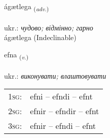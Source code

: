 \documentclass[frontgrid, backgrid]{flacards}\usepackage[]{graphicx}\usepackage[]{xcolor}
\begin{document}

\renewcommand{\flhead}{\vskip5pt \fboxsep=0pt {\small\bfseries\footnotesize Atviksorð | прислівник}}
\renewcommand{\fcfoot}{\vskip5pt \fboxsep=0pt \hspace{2pt}{\small\bfseries\footnotesize 2K}}

\renewcommand{\blhead}{\vskip5pt {\small\bfseries\footnotesize Atviksorð | прислівник }}
\renewcommand{\bcfoot}{\vskip5pt \hspace{2pt}{\small\bfseries\footnotesize 2K}}


{ágætlega \small{\textsubscript{(\textit{adv.})}} \\[1ex]
\textphonetic{[auːcaitlɛɣa]} \\
ukr.: \emph{чудово; відмінно; гарно} \\  [2ex]
ágætlega (Indeclinable)}

\renewcommand{\flhead}{\vskip5pt \fboxsep=0pt {\small\bfseries\footnotesize Sagnorð | дієслово}}
\renewcommand{\fcfoot}{\vskip5pt \fboxsep=0pt \hspace{2pt}{\small\bfseries\footnotesize 2K}}

\renewcommand{\blhead}{\vskip5pt {\small\bfseries\footnotesize Sagnorð | дієслово }}
\renewcommand{\bcfoot}{\vskip5pt \hspace{2pt}{\small\bfseries\footnotesize 2K}}


{efna \small{\textsubscript{(\textit{v.})}} \\[1ex] %
\textphonetic{[ɛpna]} \\
ukr.: \emph{виконувати; влаштовувати} \\  [2ex]
\renewcommand*{\arraystretch}{0.8}
\begin{tabular}{p{1cm}l}
\textsc{1sg}: & efni -- efndi -- efnt \\ 
\textsc{2sg}: & efnir -- efndir -- efnt \\ 
\textsc{3sg}: & efnir -- efndi -- efnt \\ 
\end{tabular}
}
\end{document}
